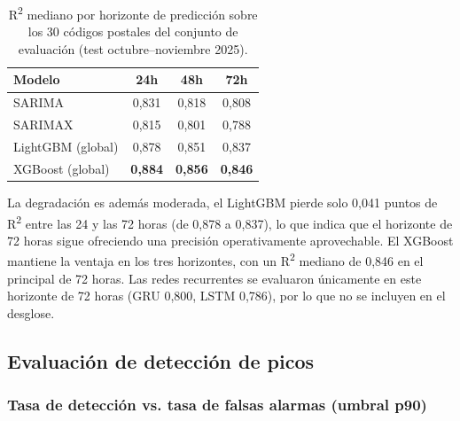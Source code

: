 \documentclass[12pt, a4paper]{article}
\begin{document}
\begin{table}[htbp]
\centering
\caption{R\textsuperscript{2} mediano por horizonte de predicción sobre los 30 códigos postales del conjunto de evaluación (test octubre--noviembre 2025).}
\label{tab:horizonte}
\begin{tabular}{lccc}
\toprule
Modelo & 24h & 48h & 72h \\
\midrule
SARIMA & 0,831 & 0,818 & 0,808 \\
SARIMAX & 0,815 & 0,801 & 0,788 \\
LightGBM (global) & 0,878 & 0,851 & 0,837 \\
XGBoost (global) & \textbf{0,884} & \textbf{0,856} & \textbf{0,846} \\
\bottomrule
\end{tabular}
\end{table}

La degradación es además moderada, el LightGBM pierde solo 0,041 puntos de R\textsuperscript{2} entre las 24 y las 72 horas (de 0,878 a 0,837), lo que indica que el horizonte de 72 horas sigue ofreciendo una precisión operativamente aprovechable. El XGBoost mantiene la ventaja en los tres horizontes, con un R\textsuperscript{2} mediano de 0,846 en el principal de 72 horas. Las redes recurrentes se evaluaron únicamente en este horizonte de 72 horas (GRU 0,800, LSTM 0,786), por lo que no se incluyen en el desglose.

\subsection{Evaluación de detección de picos}

\subsubsection{Tasa de detección vs. tasa de falsas alarmas (umbral p90)}
\end{document}

